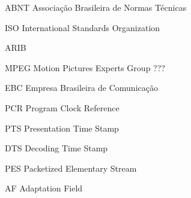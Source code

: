 \begin{siglas}
  \item[ABNT] Associação Brasileira de Normas Técnicas
  \item[ISO] International Standards Organization
  \item[ARIB]
  \item[MPEG] Motion Pictures Experts Group ???
  \item[EBC] Empresa Brasileira de Comunicação
  \item[PCR] Program Clock Reference
  \item[PTS] Presentation Time Stamp
  \item[DTS] Decoding Time Stamp
  \item[PES] Packetized Elementary Stream
  \item[AF] Adaptation Field
  \item[]
  \item[]
  \item[]
  \item[]
  \item[]
  \item[]
  \item[]
  \item[]
  
  
\end{siglas}